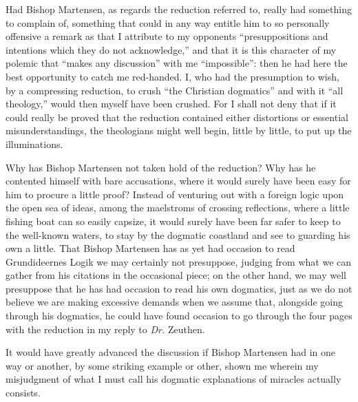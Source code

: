 \documentclass[12pt]{book}
\newcommand{\opage}[1]{\marginnote{\footnotesize\textit{[#1]}}}
\begin{document}
\opage{85}\setcounter{footnote}{0}%
Had Bishop Martensen, as regards the reduction referred to, really had something to complain of, something that could in any way entitle him to so personally offensive a remark as that I attribute to my opponents ``presuppositions and intentions which they do not acknowledge,'' and that it is this character of my polemic that ``makes any discussion'' with me ``impossible'': then he had here the best opportunity to catch me red-handed. I, who had the presumption to wish, by a compressing reduction, to crush ``the Christian dogmatics'' and with it ``all theology,'' would then myself have been crushed. For I shall not deny that if it could really be proved that the reduction contained either distortions or essential misunderstandings, the theologians might well begin, little by little, to put up the illuminations.

Why has Bishop Martensen not taken hold of the reduction? Why has he contented himself with bare accusations, where it would surely have been easy for him to procure a little proof? Instead of venturing out with a foreign logic upon the open sea of ideas, among the maelstroms of crossing reflections, where a little fishing boat can so easily capsize, it would surely have been far safer to keep to the well-known waters, to stay by the dogmatic coastland and see to guarding his own a little. That Bishop Martensen has as yet had occasion to read Grundideernes Logik we may certainly not presuppose, judging from what we can gather from his citations in the occasional piece; on the other hand, we may well presuppose that he has had occasion to read his own dogmatics, just as we do not believe we are making excessive demands when we assume that, alongside going through his dogmatics, he could have found occasion to go through the four pages with the reduction in my reply to \textit{Dr.} Zeuthen.

It would have greatly advanced the discussion if Bishop Martensen had in one way or another, by some
\opage{86}\setcounter{footnote}{0}%
striking example or other, shown me wherein my misjudgment of what I must call his dogmatic explanations of miracles actually consists.
\end{document}
